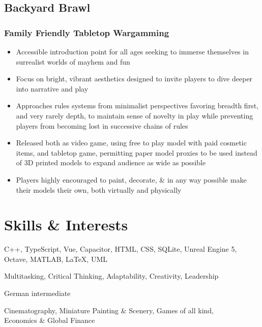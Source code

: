 \documentclass[10pt]{article} %
\begin{document}
\subsection{Backyard Brawl}
\subsubsection{Family Friendly Tabletop Wargamming}
\begin{itemize}
    \item {Accessible introduction point for all ages seeking to immerse themselves
        in surrealist worlds of mayhem and fun}
    \item {Focus on bright, vibrant aesthetics designed to invite players to dive 
        deeper into narrative and play}
    \item {Approaches rules systems from minimalist perspectives favoring breadth 
        first, and very rarely depth, to maintain sense of novelty in play while 
        preventing players from becoming lost in successive chains of rules}
    \item {Released both as video game, using free to play model with paid 
        cosmetic items, and tabletop game, permitting paper model proxies to be 
        used instead of 3D printed models to expand audience as wide as possible}
    \item {Players highly encouraged to paint, decorate, \& in any way possible make 
        their models their own, both virtually and physically}
\end{itemize}

\section{Skills \& Interests}
\begin{description}[style=multiline, leftmargin=2.75cm]
    \item[Technical] {C++, TypeScript, Vue, Capacitor, HTML, CSS, SQLite, 
        Unreal Engine 5, Octave, MATLAB, LaTeX, UML}
    \item[Soft] Multitasking, Critical Thinking, Adaptability, Creativity, Leadership 
    \item[Languages] German intermediate
    \item[Interests] Cinematography, Miniature Painting \& Scenery, Games of all kind, \\ Economics \& Global Finance
\end{description}
\end{document}
